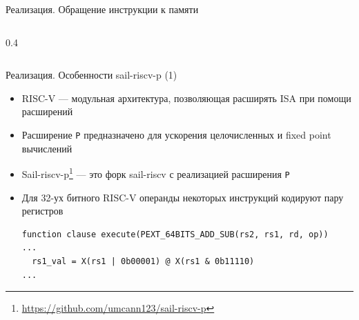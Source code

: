 \documentclass
  [ russian
  , aspectratio=169 %
  ] {beamer}
\begin{document}
\begin{frame}[fragile]{Реализация. Обращение инструкции к памяти}
\begin{columns}
\begin{column}{0.4\textwidth}
\begin{center}
            \end{center}

        \end{column}
    \end{columns}

\end{frame}

\begin{frame}[fragile]{Реализация. Особенности sail-riscv-p (1)}

    \begin{itemize}
        \item RISC-V --- модульная архитектура, позволяющая расширять ISA при помощи расширений
        \item Расширение \texttt{P} предназначено для ускорения целочисленных и fixed point вычислений
        \item Sail-riscv-p\footnote[frame]{\url{https://github.com/umcann123/sail-riscv-p}} --- это форк sail-riscv с реализацией расширения \texttt{P}
        \item Для 32-ух битного RISC-V операнды некоторых инструкций кодируют пару регистров
              \begin{lstlisting}[caption={}, language=sail, frame=single]
function clause execute(PEXT_64BITS_ADD_SUB(rs2, rs1, rd, op))
...
  rs1_val = X(rs1 | 0b00001) @ X(rs1 & 0b11110)
...
              \end{lstlisting}
    \end{itemize}

\end{frame}
\end{document}
